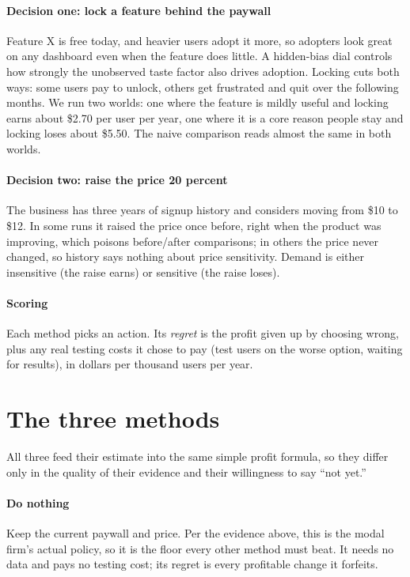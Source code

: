 \documentclass[10pt]{article}
\begin{document}
\paragraph{Decision one: lock a feature behind the paywall} Feature X is
free today, and heavier users adopt it more, so adopters look great on any
dashboard even when the feature does little. A hidden-bias dial controls how
strongly the unobserved taste factor also drives adoption. Locking cuts both
ways: some users pay to unlock, others get frustrated and quit over the
following months. We run two worlds: one where the feature is mildly useful
and locking earns about \$2.70 per user per year, one where it is a core
reason people stay and locking loses about \$5.50. The naive comparison reads almost the
same in both worlds.

\paragraph{Decision two: raise the price 20 percent} The business has three
years of signup history and considers moving from \$10 to \$12. In some runs
it raised the price once before, right when the product was improving, which
poisons before/after comparisons; in others the price never changed, so
history says nothing about price sensitivity. Demand is either insensitive
(the raise earns) or sensitive (the raise loses).

\paragraph{Scoring} Each method picks an action. Its \emph{regret} is the
profit given up by choosing wrong, plus any real testing costs it chose to
pay (test users on the worse option, waiting for results), in dollars per
thousand users per year.

\section{The three methods}
All three feed their estimate into the same simple profit formula, so they
differ only in the quality of their evidence and their willingness to say
``not yet.''

\paragraph{Do nothing} Keep the current paywall and price. Per the evidence
above, this is the modal firm's actual policy, so it is the floor every
other method must beat. It needs no data and pays no testing cost; its
regret is every profitable change it forfeits.
\end{document}
